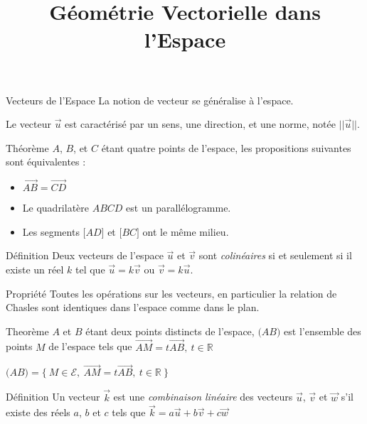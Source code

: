 \documentclass{cours}
\title{Géométrie Vectorielle dans l'Espace}
\begin{document}

    \begin{Gpartie}{Vecteurs de l'Espace} 
        La notion de vecteur se généralise à l'espace.

        Le vecteur $\vec{u}$ est caractérisé par un sens, une direction, et une norme, notée $\lvert\lvert{\vec{u}}\rvert\rvert$.
        \begin{Spartie}{Théorème} 
            $A$, $B$, et $C$ étant quatre points de l'espace, les propositions suivantes sont équivalentes :
            \begin{itemize}
                \item $\overrightarrow{AB}=\overrightarrow{CD}$
                \item Le quadrilatère $ABCD$ est un parallélogramme.
                \item Les segments $\big[AD\big]$ et $\big[BC\big]$ ont le même milieu.
            \end{itemize}
        \end{Spartie}
        \begin{Spartie}{Définition} 
            Deux vecteurs de l'espace $\vec{u}$ et $\vec{v}$ sont \emph{colinéaires} si et seulement si il existe un réel $k$ tel que $\vec{u}=k\vec{v}$ ou $\vec{v}=k\vec{u}$.
        \end{Spartie}
        \begin{Spartie}{Propriété} 
            Toutes les opérations sur les vecteurs, en particulier la relation de Chasles sont identiques dans l'espace comme dans le plan.
        \end{Spartie}
        \begin{Spartie}{Theorème} 
            $A$ et $B$ étant deux points distincts de l'espace, $\big(AB\big)$ est l'ensemble des points $M$ de l'espace tels que $\overrightarrow{AM}=t \overrightarrow{AB},\ t\in\mathbb{R}$

            $\big(AB\big)=\big\{~M\in\mathcal{E},~\overrightarrow{AM}=t\overrightarrow{AB},~t\in\mathbb{R}~\big\}$
        \end{Spartie}
        \begin{Spartie}{Définition} 
            Un vecteur $\vec{k}$ est une \emph{combinaison linéaire} des vecteurs $\vec{u}$, $\vec{v}$ et $\vec{w}$ s'il existe des réels $a$, $b$ et $c$ tels que $\vec{k}=a\vec{u}+b\vec{v}+c\vec{w}$
        \end{Spartie}
    \end{Gpartie}
\end{document}
